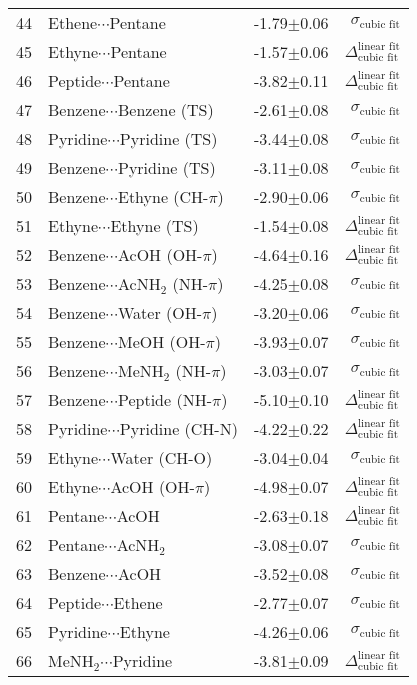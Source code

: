 \begin{longtable}{llrr}
44 & Ethene$\cdots$Pentane & -1.79$\pm$0.06 & $\sigma_\text{cubic fit}$ \\
45 & Ethyne$\cdots$Pentane & -1.57$\pm$0.06 & $\Delta_\text{cubic fit}^\text{linear fit}$ \\
46 & Peptide$\cdots$Pentane & -3.82$\pm$0.11 & $\Delta_\text{cubic fit}^\text{linear fit}$ \\
47 & Benzene$\cdots$Benzene (TS) & -2.61$\pm$0.08 & $\sigma_\text{cubic fit}$ \\
48 & Pyridine$\cdots$Pyridine (TS) & -3.44$\pm$0.08 & $\sigma_\text{cubic fit}$ \\
49 & Benzene$\cdots$Pyridine (TS) & -3.11$\pm$0.08 & $\sigma_\text{cubic fit}$ \\
50 & Benzene$\cdots$Ethyne (CH-$\pi$) & -2.90$\pm$0.06 & $\sigma_\text{cubic fit}$ \\
51 & Ethyne$\cdots$Ethyne (TS) & -1.54$\pm$0.08 & $\Delta_\text{cubic fit}^\text{linear fit}$ \\
52 & Benzene$\cdots$AcOH (OH-$\pi$) & -4.64$\pm$0.16 & $\Delta_\text{cubic fit}^\text{linear fit}$ \\
53 & Benzene$\cdots$AcNH$_2$ (NH-$\pi$) & -4.25$\pm$0.08 & $\sigma_\text{cubic fit}$ \\
54 & Benzene$\cdots$Water (OH-$\pi$) & -3.20$\pm$0.06 & $\sigma_\text{cubic fit}$ \\
55 & Benzene$\cdots$MeOH (OH-$\pi$) & -3.93$\pm$0.07 & $\sigma_\text{cubic fit}$ \\
56 & Benzene$\cdots$MeNH$_2$ (NH-$\pi$) & -3.03$\pm$0.07 & $\sigma_\text{cubic fit}$ \\
57 & Benzene$\cdots$Peptide (NH-$\pi$) & -5.10$\pm$0.10 & $\Delta_\text{cubic fit}^\text{linear fit}$ \\
58 & Pyridine$\cdots$Pyridine (CH-N) & -4.22$\pm$0.22 & $\Delta_\text{cubic fit}^\text{linear fit}$ \\
59 & Ethyne$\cdots$Water (CH-O) & -3.04$\pm$0.04 & $\sigma_\text{cubic fit}$ \\
60 & Ethyne$\cdots$AcOH (OH-$\pi$) & -4.98$\pm$0.07 & $\Delta_\text{cubic fit}^\text{linear fit}$ \\
61 & Pentane$\cdots$AcOH & -2.63$\pm$0.18 & $\Delta_\text{cubic fit}^\text{linear fit}$ \\
62 & Pentane$\cdots$AcNH$_2$ & -3.08$\pm$0.07 & $\sigma_\text{cubic fit}$ \\
63 & Benzene$\cdots$AcOH & -3.52$\pm$0.08 & $\sigma_\text{cubic fit}$ \\
64 & Peptide$\cdots$Ethene & -2.77$\pm$0.07 & $\sigma_\text{cubic fit}$ \\
65 & Pyridine$\cdots$Ethyne & -4.26$\pm$0.06 & $\sigma_\text{cubic fit}$ \\
66 & MeNH$_2$$\cdots$Pyridine & -3.81$\pm$0.09 & $\Delta_\text{cubic fit}^\text{linear fit}$ \\
\end{longtable}